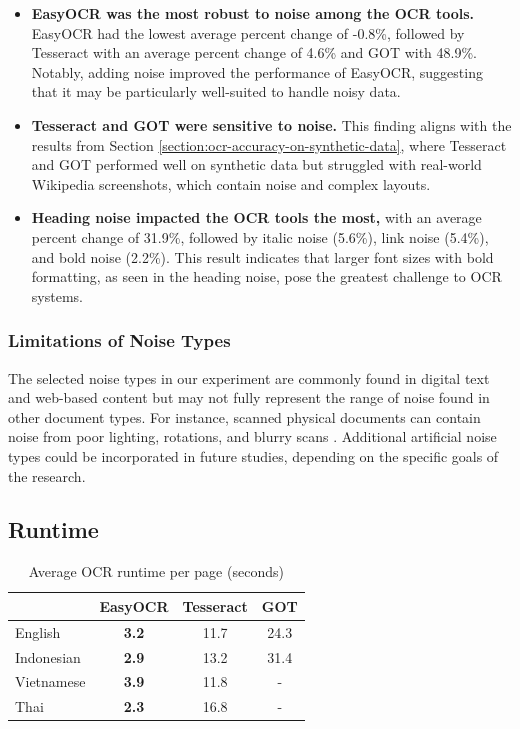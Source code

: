 \documentclass[12pt,oneside]{memoir}
\begin{document}
\begin{itemize}
    \item \textbf{EasyOCR was the most robust to noise among the OCR tools.}
    EasyOCR had the lowest average percent change of -0.8\%, followed by Tesseract with an average percent change of 4.6\% and GOT with 48.9\%. Notably, adding noise improved the performance of EasyOCR, suggesting that it may be particularly well-suited to handle noisy data.
    \item \textbf{Tesseract and GOT were sensitive to noise.} This finding aligns with the results from Section \ref{section:ocr-accuracy-on-synthetic-data}, where Tesseract and GOT performed well on synthetic data but struggled with real-world Wikipedia screenshots, which contain noise and complex layouts.
    \item \textbf{Heading noise impacted the OCR tools the most,} with an average percent change of 31.9\%, followed by italic noise (5.6\%), link noise (5.4\%), and bold noise (2.2\%). This result indicates that larger font sizes with bold formatting, as seen in the heading noise, pose the greatest challenge to OCR systems.
\end{itemize}

\subsubsection{Limitations of Noise Types}

The selected noise types in our experiment are commonly found in digital text and web-based content but may not fully represent the range of noise found in other document types.
For instance, scanned physical documents can contain noise from poor lighting, rotations, and blurry scans \parencite{hegghammer-2022}. 
Additional artificial noise types could be incorporated in future studies, depending on the specific goals of the research.

\subsection{Runtime}

\begin{table}[ht]
    \caption{Average OCR runtime per page (seconds)}
    \label{table:runtime}
    \centering
    \begin{tabular}{lccc}
        \toprule
        & EasyOCR & Tesseract & GOT\\ 
        \midrule
        English & \textbf{3.2} & 11.7 & 24.3\\
        Indonesian & \textbf{2.9} & 13.2 & 31.4\\
        Vietnamese & \textbf{3.9} & 11.8 & -\\
        Thai & \textbf{2.3} & 16.8 & -\\
        \bottomrule
    \end{tabular}
\end{table}
\end{document}
